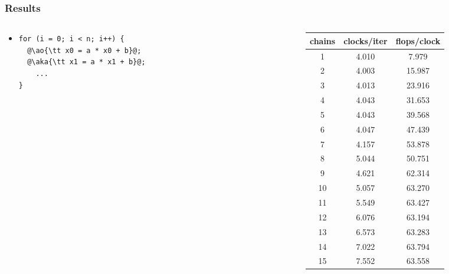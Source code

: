 \documentclass[12pt,dvipdfmx]{beamer}
\newcommand{\mura}[1]{{\color{purple}#1}}
\newcommand{\ao}[1]{{\color{blue}#1}}
\newcommand{\aka}[1]{{\color{red}#1}}
\begin{document}
\begin{frame}[fragile]
\frametitle{Results}
\begin{columns}
\begin{column}{0.55\textwidth}
\begin{center}
  {\scriptsize }
\end{center}

\begin{itemize}
\item []
\begin{lstlisting}
for (i = 0; i < n; i++) {
  @\ao{\tt x0 = a * x0 + b}@;
  @\aka{\tt x1 = a * x1 + b}@;
    ...
}
\end{lstlisting}
\end{itemize}
\end{column}
\begin{column}{0.01\textwidth}
\end{column}
\begin{column}{0.44\textwidth}
{\scriptsize
\begin{tabular}{|c|c|c|}\hline
chains & clocks/iter & flops/clock \\ \hline
1 & \mura{4.010} & 7.979 \\
2 & \mura{4.003} & 15.987 \\
3 & \mura{4.013} & 23.916 \\
4 & \mura{4.043} & 31.653 \\
5 & \mura{4.043} & 39.568 \\
6 & \mura{4.047} & 47.439 \\
7 & \mura{4.157} & 53.878 \\
8 & 5.044 & 50.751 \\
9 & 4.621 & 62.314 \\
10 & 5.057 & \ao{63.270} \\
11 & 5.549 & \ao{63.427} \\
12 & 6.076 & \ao{63.194} \\
13 & 6.573 & \ao{63.283} \\
14 & 7.022 & \ao{63.794} \\
15 & 7.552 & \ao{63.558} \\
\hline
\end{tabular}}
\end{column}    
\end{columns}

\end{frame}
\end{document}
